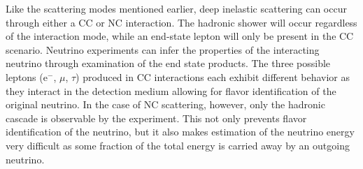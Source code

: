 \documentclass{gatech-thesis}
\begin{document}
Like the scattering modes mentioned earlier, deep inelastic scattering can occur through either a CC or NC interaction. The hadronic shower will occur regardless of the interaction mode, while an end-state lepton will only be present in the CC scenario. Neutrino experiments can infer the properties of the interacting neutrino through examination of the end state products. The three possible leptons (e$^-$, $\mu$, $\tau$) produced in CC interactions each exhibit different behavior as they interact in the detection medium allowing for flavor identification of the original neutrino. In the case of NC scattering, however, only the hadronic cascade is observable by the experiment. This not only prevents flavor identification of the neutrino, but it also makes estimation of the neutrino energy very difficult as some fraction of the total energy is carried away by an outgoing neutrino.
\end{document}
